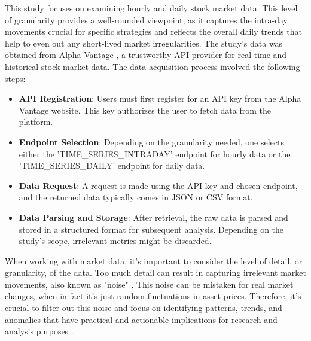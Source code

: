 \documentclass[12pt]{article}
\begin{document}
This study focuses on examining hourly and daily stock market data. This level of granularity provides a well-rounded viewpoint, as it captures the intra-day movements crucial for specific strategies and reflects the overall daily trends that help to even out any short-lived market irregularities.
The study's data was obtained from Alpha Vantage \cite{alphavantage}, a trustworthy API provider for real-time and historical stock market data. The data acquisition process involved the following steps:
\begin{itemize}
\item \textbf{API Registration}: Users must first register for an API key from the Alpha Vantage website. This key authorizes the user to fetch data from the platform.
\item \textbf{Endpoint Selection}: Depending on the granularity needed, one selects either the 'TIME\_SERIES\_INTRADAY' endpoint for hourly data or the 'TIME\_SERIES\_DAILY' endpoint for daily data.
\item \textbf{Data Request}: A request is made using the API key and chosen endpoint, and the returned data typically comes in JSON or CSV format.
\item \textbf{Data Parsing and Storage}: After retrieval, the raw data is parsed and stored in a structured format for subsequent analysis. Depending on the study's scope, irrelevant metrics might be discarded.
\end{itemize}
When working with market data, it's important to consider the level of detail, or granularity, of the data. Too much detail can result in capturing irrelevant market movements, also known as "noise" \cite{doi:10.1198/073500106000000071}. This noise can be mistaken for real market changes, when in fact it's just random fluctuations in asset prices. Therefore, it's crucial to filter out this noise and focus on identifying patterns, trends, and anomalies that have practical and actionable implications for research and analysis purposes \cite{VERMA2007231}.
\end{document}
